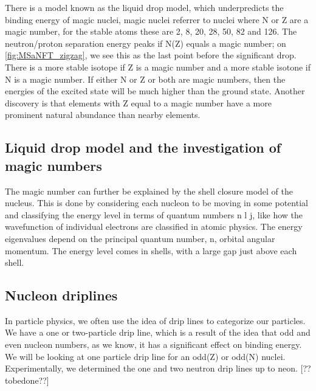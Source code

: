 There is a model known as the liquid drop model, which underpredicts the binding energy of magic nuclei, magic nuclei referrer to nuclei where N or Z are a magic number, for the stable atoms these are 2, 8, 20, 28, 50, 82 and 126.
The neutron/proton separation energy peaks if N(Z) equals a magic number; on \cref{fig:MSaNFT_zigzag}, we see this as the last point before the significant drop.
There is a more stable isotope if Z is a magic number and a more stable isotone if N is a magic number.
If either N or Z or both are magic numbers, then the energies of the excited state will be much higher than the ground state.
Another discovery is that elements with Z equal to a magic number have a more prominent natural abundance than nearby elements. \cite{kumawat_description_2018}

\subsection{Liquid drop model and the investigation of magic numbers}
The magic number can further be explained by the shell closure model of the nucleus.
This is done by considering each nucleon to be moving in some potential and classifying the energy level in terms of quantum numbers n l j, like how the wavefunction of individual electrons are classified in atomic physics.
The energy eigenvalues depend on the principal quantum number, n, orbital angular momentum.
The energy level comes in shells, with a large gap just above each shell. \cite{smolanczuk_particle}

\subsection{Nucleon driplines}
In particle physics, we often use the idea of drip lines to categorize our particles.
We have a one or two-particle drip line, which is a result of the idea that odd and even nucleon numbers, as we know, it has a significant effect on binding energy.
We will be looking at one particle drip line for an odd(Z) or odd(N) nuclei.
Experimentally, we determined the one and two neutron drip lines up to neon. [??tobedone??]